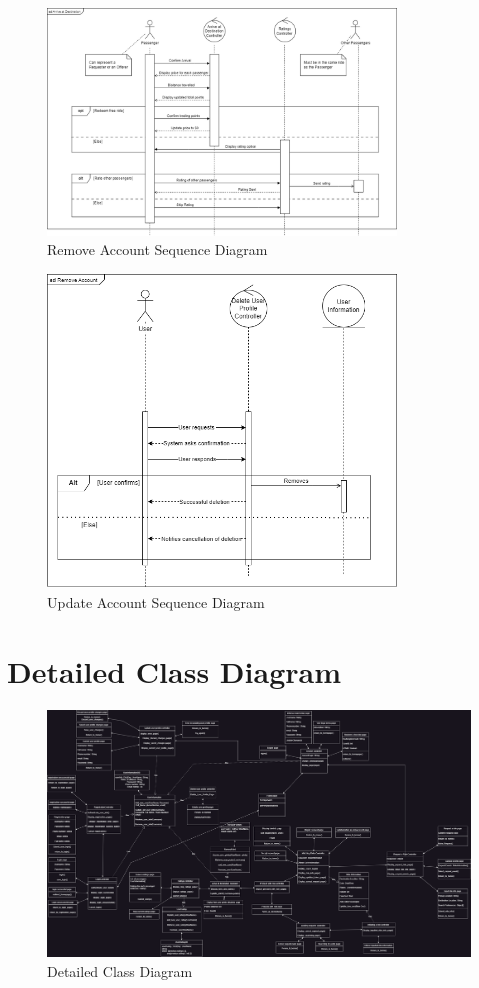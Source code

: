 \documentclass[]{article}
\begin{document}
\pagebreak
\begin{figure}[h]
	\centering
	\includegraphics[width=25em]{assets/D3_16.PNG}
	\caption{Remove Account Sequence Diagram}
	\label{fig:acd}
\end{figure}

\begin{figure}[h]
	\centering
	\includegraphics[width=25em]{assets/D3_17.PNG}
	\caption{Update Account Sequence Diagram}
	\label{fig:acd}
\end{figure}


\section{Detailed Class Diagram}
\label{sec:detailed_class_diagram}

\pagebreak
\begin{figure}[h]
	\centering
	\includegraphics[width=50em]{assets/D3_classDiagram.PNG}
	\caption{Detailed Class Diagram}
	\label{fig:acd}
\end{figure}
\end{document}
